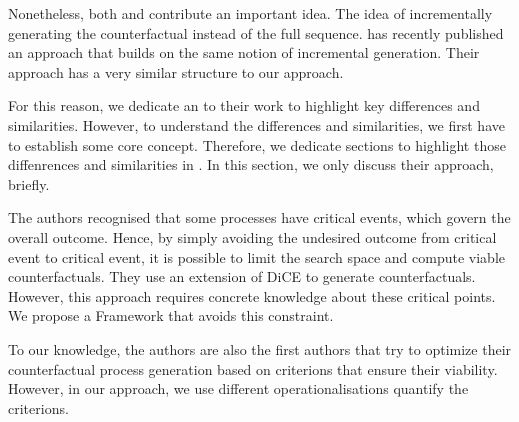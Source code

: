 \documentclass[./../../paper.tex]{subfiles}
\begin{document}
Nonetheless, both \citeauthor{tsirtsis_CounterfactualExplanationsSequential_2021} and \citeauthor{oberst_CounterfactualOffPolicyEvaluation_2019} contribute an important idea. The idea of incrementally generating the counterfactual instead of the full sequence. \citeauthor{hsieh_DiCE4ELInterpretingProcess_2021} has recently published an approach that builds on the same notion of incremental generation. Their approach has a very similar structure to our approach. 

For this reason, we dedicate an  to their work to highlight key differences and similarities. However, to understand the differences and similarities, we first have to establish some core concept. Therefore, we dedicate  sections to highlight those diffenrences and similarities in . In this section, we only discuss their approach, briefly.

The authors recognised that some processes have critical events, which govern the overall outcome. Hence, by simply avoiding the undesired outcome from critical event to critical event, it is possible to limit the search space and compute viable counterfactuals. They use an extension of DiCE to generate counterfactuals. However, this approach requires concrete knowledge about these critical points. We propose a Framework that avoids this constraint. 

To our knowledge, the authors are also the first authors that try to optimize their counterfactual process generation based on criterions that ensure their viability. However, in our approach, we use different operationalisations quantify the criterions.






\end{document}
